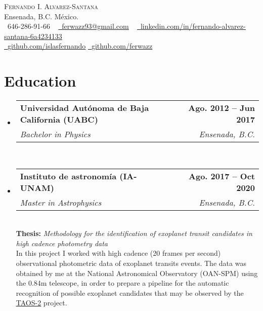 \documentclass[letterpaper,11pt]{article}
\makeatletter
\newcommand{\resumeSubheading}[4]{
  \vspace{-2pt}\item
    \begin{tabular*}{1.0\textwidth}[t]{l@{\extracolsep{\fill}}r}
      \textbf{#1} & \textbf{\small #2} \\
      \textit{\small#3} & \textit{\small #4} \\
    \end{tabular*}\vspace{-7pt}
}
\newcommand{\resumeSubHeadingListStart}{\begin{itemize}[leftmargin=0.0in, label={}]}
\newcommand{\resumeSubHeadingListEnd}{\end{itemize}}
\makeatother
\begin{document}


\begin{center}
    {\Huge \scshape Fernando I. Alvarez-Santana} \\ \vspace{1pt}
    Ensenada, B.C. México. \\ \vspace{1pt}
    \small \raisebox{-0.1\height}\faPhone\ 646-286-91-66 ~ \href{mailto:ferwazz93@gmail.com}{\raisebox{-0.2\height}\faEnvelope\  \underline{ferwazz93@gmail.com}} ~ 
    \href{https://linkedin.com/in/fernando-alvarez-santana-6a4234133/}{\raisebox{-0.2\height}\faLinkedin\ \underline{linkedin.com/in/fernando-alvarez-santana-6a4234133}}\\ \vspace{1pt}
    \href{https://github.com/islasfernando}{\raisebox{-0.2\height}\faGithub\ \underline{github.com/islasfernando}}
    \href{https://github.com/ferwazz}{\raisebox{-0.2\height}\faGithub\ \underline{github.com/ferwazz}}
    \vspace{-8pt}
\end{center}


\section{Education}
  \resumeSubHeadingListStart
    \resumeSubheading
      {Universidad Autónoma de Baja California (UABC)}{Ago. 2012 -- Jun 2017}
      {Bachelor in Physics}{Ensenada, B.C.}\\ \vspace{15pt}
    \resumeSubheading
      {Instituto de astronomía (IA-UNAM)}{Ago. 2017 -- Oct 2020}
      {Master in Astrophysics}{Ensenada, B.C.}\\ \vspace{10pt}      
      \textbf{Thesis:} \textit{Methodology for the identification of exoplanet transit candidates in high cadence photometry data}\\ \vspace{3pt}
        In this project I worked with high cadence (20 frames per second) observational photometric 
        data of exoplanet transits events. The data was obtained by me at the National
        Astronomical Observatory (OAN-SPM) using the 0.84m telescope, in order to prepare a pipeline for the automatic recognition of possible
        exoplanet candidates that may be observed by the \href{http://taos2.astrosen.unam.mx/}{\underline{TAOS-2}} project.
  \resumeSubHeadingListEnd
\end{document}

